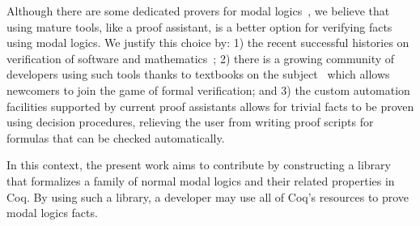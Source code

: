 \documentclass[sigconf]{acmart}
\begin{document}
Although there are some dedicated provers for modal logics~\cite{Gleissner17,Mora11},
we believe that using mature tools, like a proof assistant, is a better option for
verifying facts using modal logics. We justify this choice by: 1) the recent
successful histories on verification of software and
mathematics~\cite{Leroy09,Klein10,Gonthier13,Gonthier08}; 2) there is a growing
community of developers using such tools thanks to 
textbooks on the subject~\cite{Nipkow14,Bertot10,Chlipala13} which allows
newcomers to join the game of formal verification; and 3) the custom automation
facilities supported by current proof assistants allows for trivial facts to
be proven using decision procedures, relieving the user from writing proof
scripts for formulas that can be checked automatically.

In this context, the present work aims to contribute by constructing a library
that formalizes a family of normal modal logics and their related properties in Coq.
By using such a library, a developer may use all of Coq's resources to prove
modal logics facts.



\end{document}
